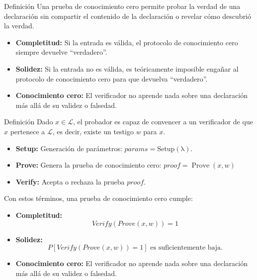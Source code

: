 \documentclass[8pt,xcolor=dvipsnames]{beamer}
\begin{document}

\begin{frame}[fragile]{Definición}
    Una prueba de conocimiento cero permite probar la verdad de una declaración sin compartir el contenido de la declaración o revelar cómo descubrió la verdad.
    \begin{itemize}
        \item \textbf{Completitud:} Si la entrada es válida, el protocolo de conocimiento cero siempre devuelve ``verdadero''.
        \item \textbf{Solidez:} Si la entrada no es válida, es teóricamente imposible engañar al protocolo de conocimiento cero para que devuelva ``verdadero''.
        \item \textbf{Conocimiento cero:} El verificador no aprende nada sobre una declaración más allá de su validez o falsedad.
    \end{itemize}
\end{frame}


\begin{frame}[fragile]{Definición}
    Dado $x \in \mathcal{L}$, el probador es capaz de convencer a un verificador de que $x$ pertenece a $\mathcal{L}$, es decir, existe un testigo $w$ para $x$.
    \begin{itemize}
        \item \textbf{Setup:} Generación de parámetros: $params = \operatorname{Setup(\lambda)}$.
        \item \textbf{Prove:} Genera la prueba de conocimiento cero: $proof = \operatorname{Prove}(x, w)$
        \item \textbf{Verify:} Acepta o rechaza la prueba $proof$.
    \end{itemize}

    Con estos términos, una prueba de conocimiento cero cumple:
    \begin{itemize}
        \item \textbf{Completitud:} 
        $$Verify(Prove(x, w)) = 1$$
        \item \textbf{Solidez:}
        $$P[Verify(Prove(x, w)) = 1] \text{ es suficientemente baja.}$$
        \item \textbf{Conocimiento cero:} El verificador no aprende nada sobre una declaración más allá de su validez o falsedad.
    \end{itemize}
\end{frame}
\end{document}
